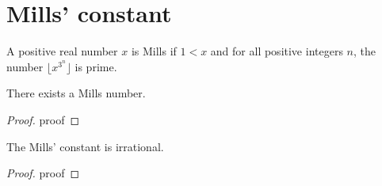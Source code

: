 %

\chapter{Mills' constant}

\begin{definition}
    \label{def:mills}
    A positive real number $x$ is Mills if $1 < x$ and
    for all positive integers $n$, the number $\lfloor x^{3^n} \rfloor$ is prime.
\end{definition}    

\begin{proposition}
    \label{prop:mills}
    There exists a Mills number.
\end{proposition}

\begin{proof}
    proof
\end{proof}

\begin{theorem}
    \label{thm:mills_irrational}
    The Mills' constant is irrational.    
\end{theorem}

\begin{proof}
    proof
\end{proof}